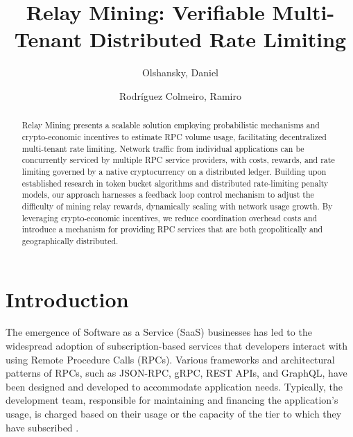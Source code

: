 \documentclass[runningheads]{llncs}
\begin{document}
\title{Relay Mining: Verifiable Multi-Tenant Distributed Rate Limiting}

\author{Olshansky, Daniel%
\and Rodr\'iguez Colmeiro, Ramiro%
}


\maketitle %

\begin{abstract}
Relay Mining presents a scalable solution employing probabilistic mechanisms and crypto-economic incentives to estimate RPC volume usage, facilitating decentralized multi-tenant rate limiting. Network traffic from individual applications can be concurrently serviced by multiple RPC service providers, with costs, rewards, and rate limiting governed by a native cryptocurrency on a distributed ledger. Building upon established research in token bucket algorithms and distributed rate-limiting penalty models, our approach harnesses a feedback loop control mechanism to adjust the difficulty of mining relay rewards, dynamically scaling with network usage growth. By leveraging crypto-economic incentives, we reduce coordination overhead costs and introduce a mechanism for providing RPC services that are both geopolitically and geographically distributed.


\end{abstract}

\section{Introduction}

The emergence of Software as a Service (SaaS) businesses has led to the widespread adoption of subscription-based services that developers interact with using Remote Procedure Calls (RPCs). Various frameworks and architectural patterns of RPCs, such as JSON-RPC, gRPC, REST APIs, and GraphQL, have been designed and developed to accommodate application needs. Typically, the development team, responsible for maintaining and financing the application's usage, is charged based on their usage or the capacity of the tier to which they have subscribed \cite{salesforceWhatSaaS}.
\end{document}
